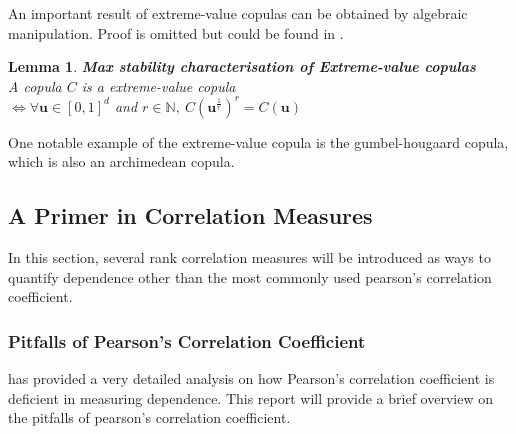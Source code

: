 \documentclass[12pt]{report}
\newtheorem{lemma}{Lemma}[subsection]
\newcommand{\1}{\mathbf{1}}
\begin{document}
An important result of extreme-value copulas can be obtained by algebraic manipulation. Proof is omitted but could be found in \cite{HofertBook}.\\

\begin{lemma}\label{MaxStability}
\textit{\normalfont\parencite{HofertBook}} \:\textbf{Max stability characterisation of Extreme-value copulas}\\

A copula $C$ is a extreme-value copula \\
$\iff \forall \boldsymbol{u} \in [0,1]^{d}$ and $r \in \mathbb{N}, \: C(\boldsymbol{u}^{\frac{1}{r}})^{r} = C(\boldsymbol{u})$

\end{lemma}
One notable example of the extreme-value copula is the gumbel-hougaard copula, which is also an archimedean copula.\\

\subsection{A Primer in Correlation Measures}
\vspace{0.5cm}
In this section, several rank correlation measures will be introduced as ways to quantify dependence other than the most commonly used pearson's correlation coefficient.

\subsubsection{Pitfalls of Pearson's Correlation Coefficient}
\vspace{0.5cm}
\:\cite{HofertBook} has provided a very detailed analysis on how Pearson's correlation coefficient is deficient in measuring dependence. This report will provide a brief overview on the pitfalls of pearson's correlation coefficient.
\end{document}
